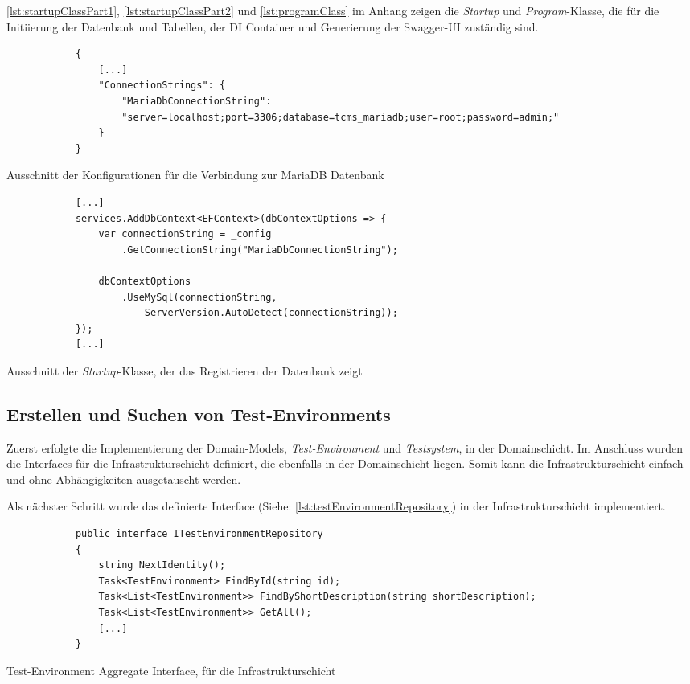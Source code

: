 \documentclass[a4paper, fontsize=11pt, parskip=half, twoside, headings=openright]{scrreprt}
\begin{document}
	\autoref{lst:startupClassPart1}, \ref{lst:startupClassPart2} und \ref{lst:programClass} im Anhang zeigen die \emph{Startup} und \emph{Program}-Klasse, die für die Initiierung der Datenbank und Tabellen, der \ac{DI} Container und Generierung der Swagger-UI zuständig sind.

	\begin{listing}[ht]
		\begin{verbatim}
			{
				[...]		
				"ConnectionStrings": {
					"MariaDbConnectionString": 
					"server=localhost;port=3306;database=tcms_mariadb;user=root;password=admin;"
				}
			}
		\end{verbatim}
		\caption{Ausschnitt der Konfigurationen für die Verbindung zur MariaDB Datenbank}
		\label{lst:connectionConfigs}
	\end{listing}

	\begin{listing}[ht]
		\begin{verbatim}
			[...]		
			services.AddDbContext<EFContext>(dbContextOptions => {
				var connectionString = _config
					.GetConnectionString("MariaDbConnectionString");
				
				dbContextOptions
					.UseMySql(connectionString,
						ServerVersion.AutoDetect(connectionString));
			});		
			[...]
		\end{verbatim}
		\caption{Ausschnitt der \emph{Startup}-Klasse, der das Registrieren der Datenbank zeigt}
		\label{lst:registerDatabase}
	\end{listing}

	\subsection{Erstellen und Suchen von Test-Environments} \label{subsec:createAndSearchTestEnvironments}
	Zuerst erfolgte die Implementierung der Domain-Models, \emph{Test-Environment} und \emph{Testsystem}, in der Domainschicht.
	Im Anschluss wurden die Interfaces für die Infrastrukturschicht definiert, die ebenfalls in der Domainschicht liegen.
	Somit kann die Infrastrukturschicht einfach und ohne Abhängigkeiten ausgetauscht werden.
	
	Als nächster Schritt wurde das definierte Interface (Siehe: \autoref{lst:testEnvironmentRepository}) in der Infrastrukturschicht implementiert.

	\begin{listing}[ht]
		\begin{verbatim}
			public interface ITestEnvironmentRepository
			{
				string NextIdentity();
				Task<TestEnvironment> FindById(string id);
				Task<List<TestEnvironment>> FindByShortDescription(string shortDescription);
				Task<List<TestEnvironment>> GetAll();
				[...]
			}
		\end{verbatim}
		\caption{Test-Environment Aggregate Interface, für die Infrastrukturschicht}
		\label{lst:testEnvironmentRepository}
	\end{listing}
\end{document}
